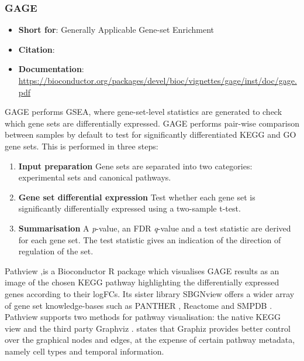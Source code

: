 \subsubsection{GAGE}
\begin{itemize}\itemsep-0.5em
\item[] \textbf{Short for}: 			Generally Applicable Gene-set Enrichment
\item[] \textbf{Citation}: 				\cite{luo2009gage}
\item[] \textbf{Documentation}: 	\url{https://bioconductor.org/packages/devel/bioc/vignettes/gage/inst/doc/gage.pdf}
\end{itemize}

GAGE performs \ac{GSEA}, where gene-set-level statistics are generated to check which gene sets are differentially expressed. %
GAGE performs pair-wise comparison between samples by default to test for significantly differentiated \ac{KEGG} and \ac{GO} gene sets. This is performed in three steps:

\begin{enumerate}
\item \textbf{Input preparation} \hspace{0.15cm} Gene sets are separated into two categories: experimental sets and canonical pathways.
\item \textbf{Gene set differential expression} \hspace{0.15cm} Test whether each gene set is significantly differentially expressed using a two-sample t-test.
\item \textbf{Summarisation} \hspace{0.15cm} A \textit{p}-value, an \ac{FDR} \textit{q}-value and a test statistic are derived for each gene set. The test statistic gives an indication of the direction of regulation of the set.
\end{enumerate} 

Pathview \citep{luo2013pathview},is a Bioconductor \citep{gentleman2004bioconductor} R package which visualises GAGE results as an image of the chosen KEGG pathway highlighting the differentially expressed genes according to their \ac{logFC}s. Its sister library SBGNview \citep{dong2022sbgnview} offers a wider array of gene set knowledge-bases such as PANTHER \citep{mi2005panther}, Reactome \citep{croft2010reactome} and SMPDB \citep{frolkis2010smpdb}. Pathview supports two methods for pathway visualisation: the native KEGG view and the third party Graphviz \citep{ellson2001graphviz}. \cite{luo2013pathview} states that Graphiz provides better control over the graphical nodes and edges, at the expense of certain pathway metadata, namely cell types and temporal information.

